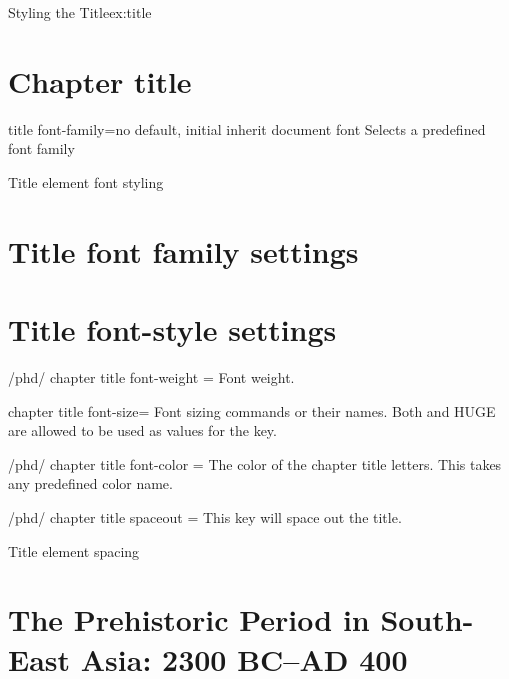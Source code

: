 \begin{texexample}{Styling the Title}{ex:title} 
\chapter{Chapter title}
\lorem
\end{texexample}


\begin{docKey}[phd]{title font-family}{=}{no default, initial inherit document font}
Selects a predefined font family
\end{docKey}

\begin{texexample}{Title element font styling}{}
\chapter{Title font family settings}
\lorem
{}
\chapter{Title font-style settings}
\lorem
\end{texexample}


\begin{key}{/phd/ chapter title font-weight = } Font weight.
\end{key}

\begin{docKey}[phd]{chapter title font-size}{= }{}
Font sizing commands or their names. Both \cmd{\HUGE} and HUGE are allowed to be used as values for the key.
\end{docKey}

\begin{key}{/phd/ chapter title font-color = }
The color of the chapter title letters. This takes any predefined color name. 
\end{key}


\begin{key}{/phd/ chapter title spaceout = }
 This key will space out the title. 
\end{key}

\begin{texexample}{Title element spacing}{}
\chapter{The Prehistoric Period in South-East Asia: 2300 BC--AD 400}        
\lorem 
    
\end{texexample}


